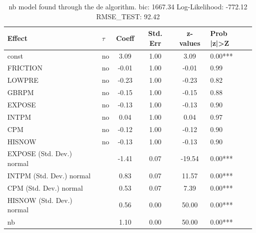 \begin{table}
	\caption{nb model found through the de algorithm. bic: 1667.34 Log-Likelihood: -772.12 RMSE_TEST: 92.42}
	\begin{center}
		\begin{tabular}{|l|l|c|c|c|l|}
			\hline
			Effect & $\tau$ & Coeff & Std. Err & z-values & Prob |z|>Z \\
			\hline
			const & no & 3.09 & 1.00 & 3.09 & 0.00*** \\
			\hline
			FRICTION & no & -0.01 & 1.00 & -0.01 & 0.99 \\
			\hline
			LOWPRE & no & -0.23 & 1.00 & -0.23 & 0.82 \\
			\hline
			GBRPM & no & -0.15 & 1.00 & -0.15 & 0.88 \\
			\hline
			EXPOSE & no & -0.13 & 1.00 & -0.13 & 0.90 \\
			\hline
			INTPM & no & 0.04 & 1.00 & 0.04 & 0.97 \\
			\hline
			CPM & no & -0.12 & 1.00 & -0.12 & 0.90 \\
			\hline
			HISNOW & no & -0.13 & 1.00 & -0.13 & 0.90 \\
			\hline
			EXPOSE (Std. Dev.) normal &  & -1.41 & 0.07 & -19.54 & 0.00*** \\
			\hline
			INTPM (Std. Dev.) normal &  & 0.83 & 0.07 & 11.57 & 0.00*** \\
			\hline
			CPM (Std. Dev.) normal &  & 0.53 & 0.07 & 7.39 & 0.00*** \\
			\hline
			HISNOW (Std. Dev.) normal &  & 0.56 & 0.00 & 50.00 & 0.00*** \\
			\hline
			nb &  & 1.10 & 0.00 & 50.00 & 0.00*** \\
			\hline
		\end{tabular}
	\end{center}
\end{table}